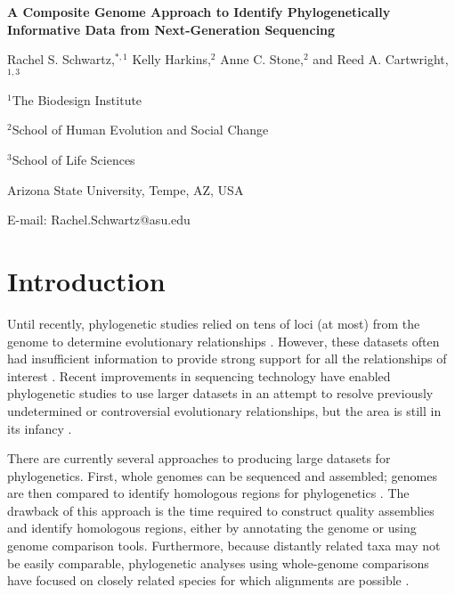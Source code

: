 \documentclass[11pt, oneside]{article}   	%
\begin{document}
\noindent
\textbf{A Composite Genome Approach to Identify Phylogenetically Informative Data from Next-Generation Sequencing}


Rachel S. Schwartz,$^{\ast,1}$ Kelly Harkins,$^{2}$ Anne C. Stone,$^{2}$ and Reed A. Cartwright,$^{1,3}$

$^{1}$The Biodesign Institute

$^{2}$School of Human Evolution and Social Change

$^{3}$School of Life Sciences

Arizona State University, Tempe, AZ, USA

E-mail: Rachel.Schwartz@asu.edu

\linenumbers
{}


\section{{Introduction}\label{sec:Intro}}

Until recently, phylogenetic studies relied on tens of loci (at most) from the genome to determine evolutionary relationships \citep[e.g.][]{Giribet2001,Harpke2013}. 
However, these datasets often had insufficient information to provide strong support for all the relationships of interest \citep[e.g.][]{Stanley2011}. 
Recent improvements in sequencing technology have enabled phylogenetic studies to use larger datasets in an attempt to resolve previously undetermined or controversial evolutionary relationships, but the area is still in its infancy \citep{Burleigh2011,Cohen2012,Crawford2012,Delsuc2005,Faircloth2012,McCormack2012,Mccormack2013b,Yoder2013}. 

There are currently several approaches to producing large datasets for phylogenetics. 
First, whole genomes can be sequenced and assembled; genomes are then compared to identify homologous regions for phylogenetics \citep[e.g.][]{Yoder2013}.
The drawback of this approach is the time required to construct quality assemblies and identify homologous regions, either by annotating the genome or using genome comparison tools.
Furthermore, because distantly related taxa may not be easily comparable, phylogenetic analyses using whole-genome comparisons have  focused on closely related species for which alignments are possible \citep[e.g.][]{Yoder2013,Fan2013}.
\end{document}
